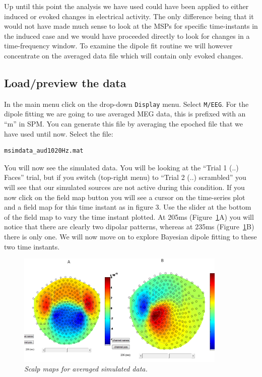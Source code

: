 Up until this point the analysis we have used could have been applied to either induced or evoked changes in electrical activity. The only difference being that it would not have made much sense to look at the MSPs for specific time-instants in the induced case and we would have proceeded directly to look for changes in a time-frequency window. To examine the dipole fit routine we will however concentrate on the averaged data file which will contain only evoked changes.

\subsection{Load/preview the data}

In the main menu click on the drop-down \texttt{Display} menu. Select \texttt{M/EEG}. For the dipole fitting we are going to use averaged MEG data, this is prefixed with an ``m'' in SPM. You can generate this file by averaging the epoched file that we have used until now. Select the file:

\begin{verbatim}
msimdata_aud1020Hz.mat
\end{verbatim}

You will now see the simulated data. You will be looking at the ``Trial 1 (..) Faces'' trial,  but if you switch (top-right menu) to ``Trial 2 (..) scrambled'' you will see that our simulated sources are not active during this condition.  If you now click on the field map button you will see a cursor on the time-series plot and a field map for this time instant as in figure 3. Use the slider at the bottom of the field map to vary the time instant plotted. At 205ms (Figure~\ref{meg_sloc:fig:14}A) you will notice that there are clearly two dipolar patterns, whereas at 235ms (Figure~\ref{meg_sloc:fig:14}B) there is only one.
We will now move on to explore Bayesian dipole fitting to these two time instants.

\begin{figure}
\begin{center}
\includegraphics[width=100mm]{meg_sloc/slide14}
\caption{\em Scalp maps for averaged simulated data.\label{meg_sloc:fig:14}}
\end{center}
\end{figure}

